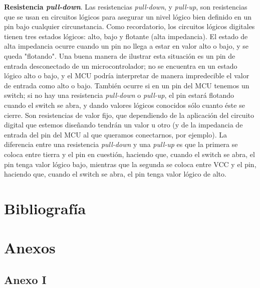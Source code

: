 \documentclass[12pt]{article}
\begin{document}
	\noindent \textbf{\large Resistencia \textit{pull-down}}. Las resistencias \textit{pull-down}, y \textit{pull-up}, son resistencias que se usan en circuitos lógicos para asegurar un nivel lógico bien definido en un pin bajo cualquier circunstancia. Como recordatorio, los circuitos lógicos digitales tienen tres estados lógicos: alto, bajo y flotante (alta impedancia). El estado de alta impedancia ocurre cuando un pin no llega a estar en valor alto o bajo, y se queda "flotando". Una buena manera de ilustrar esta situación es un pin de entrada desconectado de un microcontrolador; no se encuentra en un estado lógico alto o bajo, y el MCU podría interpretar de manera impredecible el valor de entrada como alto o bajo. También ocurre si en un pin del MCU tenemos un switch; si no hay una resistencia \textit{pull-down} o \textit{pull-up}, el pin estará flotando cuando el switch se abra, y dando valores lógicos conocidos sólo cuanto éste se cierre. Son resistencias de valor fijo, que dependiendo de la aplicación del circuito digital que estemos diseñando tendrán un valor u otro (y de la impedancia de entrada del pin del MCU al que queramos conectarnos, por ejemplo). La diferencia entre una resistencia \textit{pull-down} y una \textit{pull-up} es que la primera se coloca entre tierra y el pin en cuestión, haciendo que, cuando el switch se abra, el pin tenga valor lógico bajo, mientras que la segunda se coloca entre VCC y el pin, haciendo que, cuando el switch se abra, el pin tenga valor lógico de alto.\\ 
	
	\pagebreak
	
	\section*{Bibliografía}
	
	\pagebreak
	
	\section*{Anexos}
	
	\pagebreak
	
	\subsection*{Anexo I}
	
\end{document}
